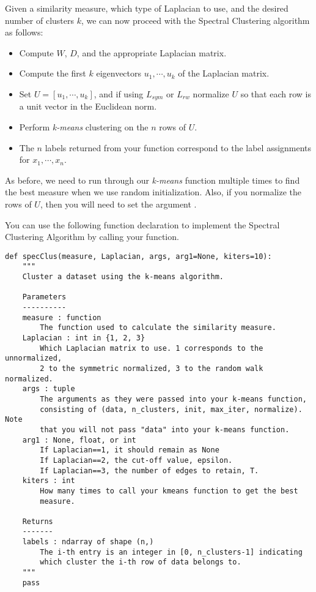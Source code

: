 Given a similarity measure, which type of Laplacian to use, and the desired number of clusters $k$, we can now proceed with the Spectral Clustering algorithm as follows:

\begin{itemize}
    \item Compute $W$, $D$, and the appropriate Laplacian matrix.
    \item Compute the first $k$ eigenvectors $u_1, \cdots , u_k$ of the Laplacian matrix.
    \item Set $U = [u_1, \cdots , u_k]$, and if using $L_{sym}$ or $L_{rw}$ normalize $U$ so that each row is a unit vector in the Euclidean norm.
    \item Perform \emph{k-means} clustering on the $n$ rows of $U$.
    \item The $n$ labels returned from your  function correspond to the label assignments for $x_1, \cdots, x_n$.
\end{itemize}

As before, we need to run through our \emph{k-means} function multiple times to find the best measure when we use random initialization.  Also, if you normalize the rows of $U$, then you will need to set the argument .

You can use the following function declaration to implement the Spectral Clustering Algorithm by calling your  function.
\begin{lstlisting}
def specClus(measure, Laplacian, args, arg1=None, kiters=10):
    """
    Cluster a dataset using the k-means algorithm.

    Parameters
    ----------
    measure : function
        The function used to calculate the similarity measure.
    Laplacian : int in {1, 2, 3}
        Which Laplacian matrix to use. 1 corresponds to the unnormalized,
        2 to the symmetric normalized, 3 to the random walk normalized.
    args : tuple
        The arguments as they were passed into your k-means function,
        consisting of (data, n_clusters, init, max_iter, normalize). Note
        that you will not pass "data" into your k-means function.
    arg1 : None, float, or int
        If Laplacian==1, it should remain as None
        If Laplacian==2, the cut-off value, epsilon.
        If Laplacian==3, the number of edges to retain, T.
    kiters : int
        How many times to call your kmeans function to get the best
        measure.

    Returns
    -------
    labels : ndarray of shape (n,)
        The i-th entry is an integer in [0, n_clusters-1] indicating
        which cluster the i-th row of data belongs to.
    """
    pass
\end{lstlisting}

